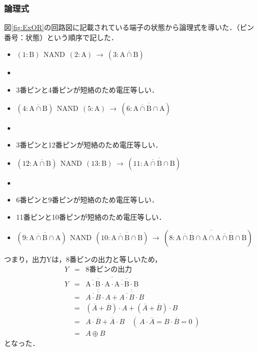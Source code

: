 \subsubsection{論理式}
\label{ExOR_ronrishiki}
図\ref{fig:ExOR}の回路図に記載されている端子の状態から論理式を導いた．（ピン番号：状態）という順序で記した．
\begin{itemize}
	\item []$(1:\mathrm{B})
			~~\mathrm{NAND}~~
			(2:\mathrm{A})
			~\rightarrow~
			(3:\overline{\mathrm{A}\cap \mathrm{B}})$ 
			
	\item []
	\item []3番ピンと4番ピンが短絡のため電圧等しい．
	
	\item []$(4:\overline{\mathrm{A}\cap \mathrm{B}})
			~~\mathrm{NAND}~~
			(5:\mathrm{A})
			~\rightarrow~
			(6:\overline{\overline{\mathrm{A}\cap \mathrm{B}}\cap \mathrm{A}})$ 
			
	\item []
	\item []3番ピンと12番ピンが短絡のため電圧等しい．
	
	\item []$(12:\overline{\mathrm{A}\cap \mathrm{B}})
			~~\mathrm{NAND}~~
			(13:\mathrm{B})
			~\rightarrow~
			(11:\overline{\overline{\mathrm{A}\cap \mathrm{B}}\cap\mathrm{B}})$
	
	\item []
	\item []6番ピンと9番ピンが短絡のため電圧等しい．
	\item []11番ピンと10番ピンが短絡のため電圧等しい．
	
	\item []$(9:\overline{\overline{\mathrm{A}\cap \mathrm{B}}\cap \mathrm{A}})
			~~\mathrm{NAND}~~
			(10:\overline{\overline{\mathrm{A}\cap \mathrm{B}}\cap\mathrm{B}})
			~\rightarrow~
			(8:\overline{\overline{\overline{\mathrm{A}\cap \mathrm{B}}\cap\mathrm{A}} 
			\cap 
			\overline{\overline{\mathrm{A}\cap \mathrm{B}}\cap \mathrm{B}}})$
			
\end{itemize}

つまり，出力Yは，8番ピンの出力と等しいため，
\begin{eqnarray}
	Y&=&8番ピンの出力\nonumber \\
	Y&=&\overline{\overline{\overline{\mathrm{A}\cdot \mathrm{B}}\cdot \mathrm{A}}
	 \cdot 
	 \overline{\overline{\mathrm{A}\cdot \mathrm{B}}\cdot \mathrm{B}}}\nonumber\\
	&=&\overline{\overline{\overline{A \cdot B }\cdot A}} +\overline{\overline{\overline{A\cdot B }\cdot B}} \nonumber\\
	&=&(\overline{A}+\overline{B}) \cdot A + (\overline{A} + \overline{B} ) \cdot B \nonumber \\
	&=& A \cdot \overline{B} + \overline{A} \cdot B \quad \left(~A \cdot \overline{A} = B \cdot \overline{B} = 0 ~\right)\nonumber \\
	&=& A\oplus B \nonumber 
\end{eqnarray}
となった．

